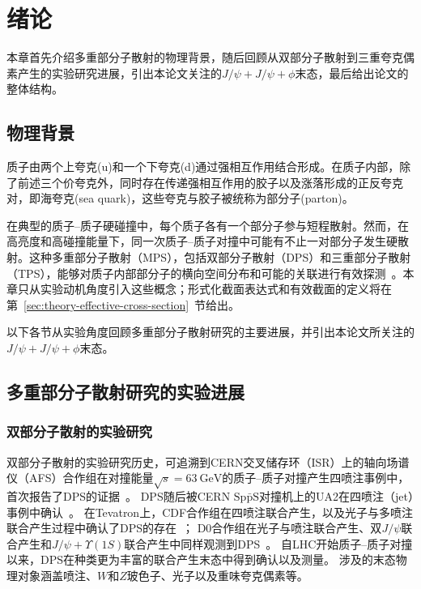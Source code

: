 \chapter{绪论}
\label{chap:introduction}

本章首先介绍多重部分子散射的物理背景，随后回顾从双部分子散射到三重夸克偶素产生的实验研究进展，引出本论文关注的$J/\psi+J/\psi+\phi$末态，最后给出论文的整体结构。

\section{物理背景}


质子由两个上夸克(u)和一个下夸克(d)通过强相互作用结合形成。在质子内部，除了前述三个价夸克外，同时存在传递强相互作用的胶子以及涨落形成的正反夸克对，即海夸克(sea quark)，这些夸克与胶子被统称为部分子(parton)。


在典型的质子--质子硬碰撞中，每个质子各有一个部分子参与短程散射。然而，在高亮度和高碰撞能量下，同一次质子--质子对撞中可能有不止一对部分子发生硬散射。这种多重部分子散射（MPS），包括双部分子散射（DPS）和三重部分子散射（TPS），能够对质子内部部分子的横向空间分布和可能的关联进行有效探测~\cite{Z48W3VLV,denterriaDoubleTripleNparton2017,WHQAFHD5}。本章只从实验动机角度引入这些概念；形式化截面表达式和有效截面的定义将在第~\ref{sec:theory-effective-cross-section}~节给出。

以下各节从实验角度回顾多重部分子散射研究的主要进展，并引出本论文所关注的$J/\psi+J/\psi+\phi$末态。

\section{多重部分子散射研究的实验进展}

\subsection{双部分子散射的实验研究}
\label{sec:intro-dps-experimental-progress}

双部分子散射的实验研究历史，可追溯到CERN交叉储存环（ISR）上的轴向场谱仪（AFS）合作组在对撞能量$\sqrt{s}=\SI{63}{\giga\eV}$的质子--质子对撞产生四喷注事例中，首次报告了DPS的证据~\cite{AFS_DPS_1987}。
DPS随后被CERN $\mathrm{Sp\bar{p}S}$对撞机上的UA2在四喷注（jet）事例中确认~\cite{UA2_DPS_1991}。
在Tevatron上，CDF合作组在四喷注联合产生，以及光子与多喷注联合产生过程中确认了DPS的存在~\cite{CDF_4JET_1993,CDF_DPS_1997}；
D0合作组在光子与喷注联合产生、双$J/\psi$联合产生和$J/\psi+\Upsilon(1S)$联合产生中同样观测到DPS~\cite{D0_GAMMA3JET_2014,D0_JPSIJPSI_2014,D0_JPSIUPSILON_2016}。
自LHC开始质子--质子对撞以来，DPS在种类更为丰富的联合产生末态中得到确认以及测量。
涉及的末态物理对象涵盖喷注、$W$和$Z$玻色子、光子以及重味夸克偶素等\cite{BORSCHENSKY_KULESZA_2017,CMS_JPSI_PAIR_7TEV,ATLAS_JPSIJPSI_8TEV}。

